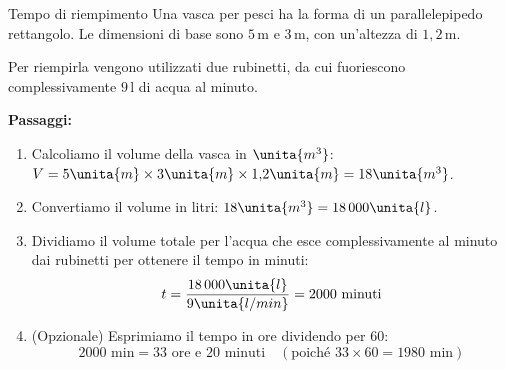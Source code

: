 \begin{esercizio}{Tempo di riempimento}
Una vasca per pesci ha la forma di un parallelepipedo rettangolo. Le dimensioni di base sono $5\,\mathrm{m}$ e $3\,\mathrm{m}$, con un'altezza di $1{,}2\,\mathrm{m}$.

Per riempirla vengono utilizzati due rubinetti, da cui fuoriescono complessivamente $9\,\mathrm{l}$ di acqua al minuto.



\responsespace{7cm}

\begin{soluzione}
  \textbf{Passaggi:}
  \begin{enumerate}
    \item Calcoliamo il volume della vasca in $\unita{m^3}$: $V = 5\unita{m} \times 3\unita{m} \times 1{,}2\unita{m} = 18\unita{m^3}$.
    \item Convertiamo il volume in litri: $18\unita{m^3} = 18\,000\unita{l}$.
    \item Dividiamo il volume totale per l'acqua che esce complessivamente al minuto dai rubinetti per ottenere il tempo in minuti:
    \[
    t = \frac{18\,000\unita{l}}{9\unita{l/min}} = 2000\text{ minuti}
    \]
    \item (Opzionale) Esprimiamo il tempo in ore dividendo per $60$:
    \[
    2000\text{ min} = 33\text{ ore e } 20\text{ minuti} \quad (\text{poiché } 33 \times 60 = 1980\text{ min})
    \]
  \end{enumerate}
\end{soluzione}
\end{esercizio}

\condnewpage

